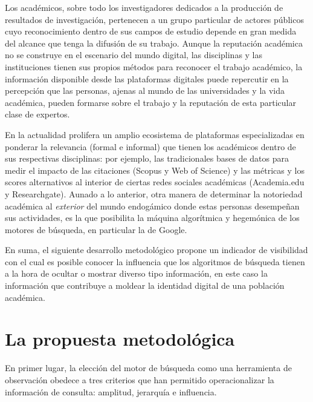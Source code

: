 \documentclass[
]{interact}
\begin{document}
Los académicos, sobre todo los investigadores dedicados a la producción
de resultados de investigación, pertenecen a un grupo particular de
actores públicos cuyo reconocimiento dentro de sus campos de estudio
depende en gran medida del alcance que tenga la difusión de su trabajo.
Aunque la reputación académica no se construye en el escenario del mundo
digital, las disciplinas y las instituciones tienen sus propios métodos
para reconocer el trabajo académico, la información disponible desde las
plataformas digitales puede repercutir en la percepción que las
personas, ajenas al mundo de las universidades y la vida académica,
pueden formarse sobre el trabajo y la reputación de esta particular
clase de expertos.

En la actualidad prolifera un amplio ecosistema de plataformas
especializadas en ponderar la relevancia (formal e informal) que tienen
los académicos dentro de sus respectivas disciplinas: por ejemplo, las
tradicionales bases de datos para medir el impacto de las citaciones
(Scopus y Web of Science) y las métricas y los scores alternativos al
interior de ciertas redes sociales académicas (Academia.edu y
Researchgate). Aunado a lo anterior, otra manera de determinar la
notoriedad académica al \emph{exterior} del mundo endogámico donde estas
personas desempeñan sus actividades, es la que posibilita la máquina
algorítmica y hegemónica de los motores de búsqueda, en particular la de
Google.

En suma, el siguiente desarrollo metodológico propone un indicador de
visibilidad con el cual es posible conocer la influencia que los
algoritmos de búsqueda tienen a la hora de ocultar o mostrar diverso
tipo información, en este caso la información que contribuye a moldear
la identidad digital de una población académica.

\section{La propuesta metodológica}\label{la-propuesta-metodoluxf3gica}

En primer lugar, la elección del motor de búsqueda como una herramienta
de observación obedece a tres criterios que han permitido
operacionalizar la información de consulta: amplitud, jerarquía e
influencia.
\end{document}
